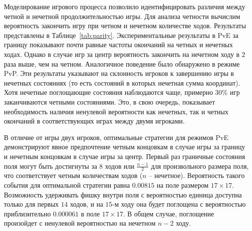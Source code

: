 Моделирование игрового процесса позволило идентифицировать различия между четной и нечетной продолжительностью игры. Для анализа четности вычислим вероятность закончить игру при четном и нечетном количестве ходов. Результаты представлены в Таблице~\cref{tab:parity}. Экспериментальные результаты в PvE за границу показывают почти равные частоты окончаний на четных и нечетных ходах. Однако в случае игр за центр вероятность закончить на нечетном ходу в $2$ раза выше, чем на четном. Аналогичное поведение было обнаружено в режиме PvP. Эти результаты указывают на склонность игроков к завершению игры в нечетных состояниях (то есть состояний в которых нечетная сумма координат). Хотя нечетные поглощающие состояния наблюдаются чаще, примерно $30\%$ игр заканчиваются четными состояниями. Это, в свою очередь, показывает необходимость наличия ненулевой вероятности как нечетных, так и четных окончаний в соответствующих играх между двумя игроками.

В отличие от игры двух игроков, оптимальные стратегии для режимов PvE демонстрируют явное предпочтение четным концовкам в случае игры за границу и нечетным концовкам в случае игры за центр. Первый раз граничные состояния поля могут быть достигнуты за $8$ ходов или $\frac{n-1}{2}$ для произвольного размера поля, что соответствует четным количествам ходов ($n$ -- нечетное). Вероятность такого события для оптимальной стратегии равна $0.00815$ на поле размером $17 \times 17$. Возможность удерживать фишку внутри поля с вероятностью единица доступна только для первых $14$ ходов, и на $15$-м ходу она будет поглощена с вероятностью приблизительно $0.000061$ в поле $17 \times 17$. В общем случае, поглощение произойдет с ненулевой вероятностью на нечетном $n-2$ ходу.

